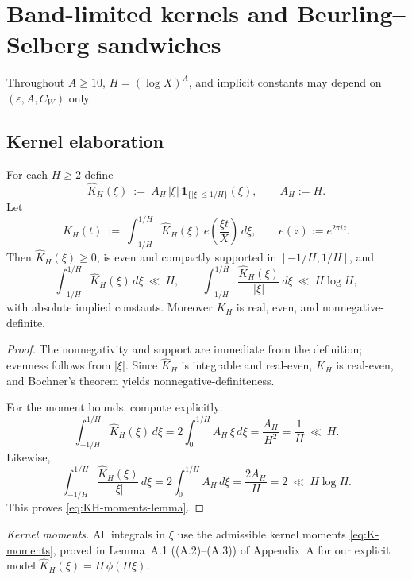 \appendix
\section{Band-limited kernels and Beurling–Selberg sandwiches}\label{sec:appendix-kernels}

Throughout $A\ge 10$, $H=(\log X)^A$, and implicit constants may depend on $(\varepsilon,A,C_W)$ only.


\subsection*{Kernel elaboration}
\begin{lemma}\label{lem:kernel}
For each $H\ge2$ define
\[
\widehat K_H(\xi)\ :=\ A_H\,|\xi|\,\mathbf{1}_{\{|\xi|\le 1/H\}}(\xi),
\qquad A_H:=H.
\]
Let
\[
K_H(t)\ :=\ \int_{-1/H}^{1/H}\widehat K_H(\xi)\,e\!\left(\frac{\xi t}{X}\right)\,d\xi,
\qquad e(z):=e^{2\pi i z}.
\]
Then $\widehat K_H(\xi)\ge0$, is even and compactly supported in $[-1/H,1/H]$, and
\begin{equation}\label{eq:KH-moments-lemma}
\int_{-1/H}^{1/H}\!\widehat K_H(\xi)\,d\xi\ \ll\ H,\qquad
\int_{-1/H}^{1/H}\!\frac{\widehat K_H(\xi)}{|\xi|}\,d\xi\ \ll\ H\log H,
\end{equation}
with absolute implied constants. Moreover $K_H$ is real, even, and nonnegative-definite.
\end{lemma}

\begin{proof}
The nonnegativity and support are immediate from the definition; evenness follows from $|\xi|$.
Since $\widehat K_H$ is integrable and real-even, $K_H$ is real-even, and Bochner's theorem yields nonnegative-definiteness.

For the moment bounds, compute explicitly:
\[
\int_{-1/H}^{1/H}\widehat K_H(\xi)\,d\xi
= 2\int_{0}^{1/H} A_H\,\xi\,d\xi
= \frac{A_H}{H^2}
= \frac{1}{H}
\ \ll\ H.
\]
Likewise,
\[
\int_{-1/H}^{1/H}\frac{\widehat K_H(\xi)}{|\xi|}\,d\xi
= 2\int_{0}^{1/H} A_H\,d\xi
= \frac{2A_H}{H}
= 2
\ \ll\ H\log H.
\]
This proves \eqref{eq:KH-moments-lemma}.
\end{proof}

\noindent\emph{Kernel moments.}
All integrals in $\xi$ use the admissible kernel moments \eqref{eq:K-moments}, proved in Lemma~A.1 ((A.2)–(A.3)) of Appendix~A for our explicit model $\widehat K_H(\xi)=H\,\phi(H\xi)$.

